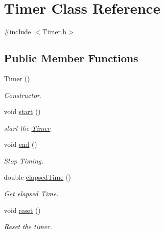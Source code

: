 \hypertarget{class_timer}{}\section{Timer Class Reference}
\label{class_timer}


{\ttfamily \#include $<$Timer.\+h$>$}

\subsection*{Public Member Functions}
\begin{DoxyCompactItemize}
\item 
\mbox{\label{class_timer_a5f16e8da27d2a5a5242dead46de05d97}} 
\mbox{\hyperlink{class_timer_a5f16e8da27d2a5a5242dead46de05d97}{Timer}} ()
\begin{DoxyCompactList}\small\item\em Constructor. \end{DoxyCompactList}\item 
\mbox{\label{class_timer_a3a8b5272198d029779dc9302a54305a8}} 
void \mbox{\hyperlink{class_timer_a3a8b5272198d029779dc9302a54305a8}{start}} ()
\begin{DoxyCompactList}\small\item\em start the \mbox{\hyperlink{class_timer}{Timer}} \end{DoxyCompactList}\item 
\mbox{\label{class_timer_accef2f2b25869fbca2947a56b494d2a0}} 
void \mbox{\hyperlink{class_timer_accef2f2b25869fbca2947a56b494d2a0}{end}} ()
\begin{DoxyCompactList}\small\item\em Stop Timing. \end{DoxyCompactList}\item 
double \mbox{\hyperlink{class_timer_a034b4f311dbba1ba6ace1af3cf7c6f97}{elapsed\+Time}} ()
\begin{DoxyCompactList}\small\item\em Get elapsed Time. \end{DoxyCompactList}\item 
\mbox{\label{class_timer_a9020542d73357a4eef512eefaf57524b}} 
void \mbox{\hyperlink{class_timer_a9020542d73357a4eef512eefaf57524b}{reset}} ()
\begin{DoxyCompactList}\small\item\em Reset the timer. \end{DoxyCompactList}\end{DoxyCompactItemize}

